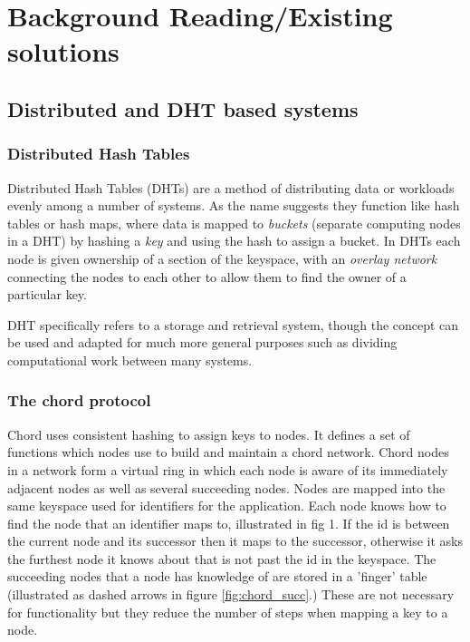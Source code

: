\documentclass{article}
\begin{document}
\section{Background Reading/Existing solutions}
\subsection{Distributed and DHT based systems}

\subsubsection{Distributed Hash Tables}
Distributed Hash Tables (DHTs) are a method of distributing data or workloads evenly among a number of systems. As the name suggests they function like hash tables or hash maps, where data is mapped to \textit{buckets} (separate computing nodes in a DHT) by hashing a \textit{key} and using the hash to assign a bucket. In DHTs each node is given ownership of a section of the keyspace, with an \textit{overlay network} connecting the nodes to each other to allow them to find the owner of a particular key.

DHT specifically refers to a storage and retrieval system, though the concept can be used and adapted for much more general purposes such as dividing computational work between many systems.

\subsubsection{The chord protocol} 
Chord \cite{chord} uses consistent hashing to assign keys to nodes. It defines a set of functions which nodes use to build and maintain a chord network. Chord nodes in a network form a virtual ring in which each node is aware of its immediately adjacent nodes as well as several succeeding nodes.
Nodes are mapped into the same keyspace used for identifiers for the application.
Each node knows how to find the node that an identifier maps to, illustrated in fig 1. If the id is between the current node and its successor then it maps to the successor, otherwise it asks the furthest node it knows about that is not past the id in the keyspace. The succeeding nodes that a node has knowledge of are stored in a 'finger' table (illustrated as dashed arrows in figure \ref{fig:chord_succ}.) These are not necessary for functionality but they reduce the number of steps when mapping a key to a node.
\end{document}
